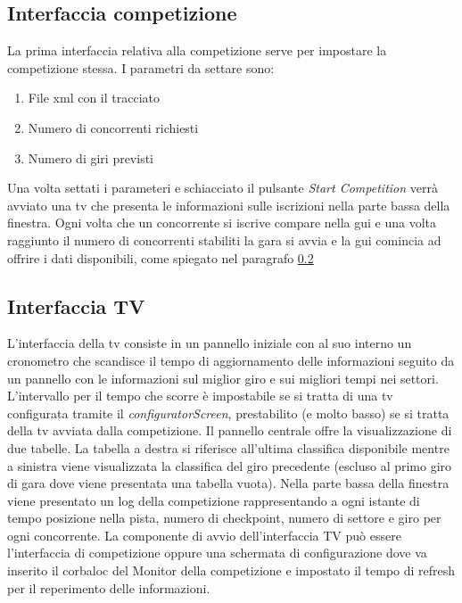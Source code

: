 \subsection{Interfaccia competizione}
La prima interfaccia relativa alla competizione serve per impostare la competizione stessa. I parametri da settare sono:
\begin{enumerate}
\item File xml con il tracciato
\item Numero di concorrenti richiesti
\item Numero di giri previsti
\end{enumerate}
Una volta settati i parameteri e schiacciato il pulsante \emph{Start Competition} verr\`{a} avviato una tv che presenta le informazioni sulle iscrizioni nella parte bassa della finestra. Ogni volta che un concorrente si iscrive compare nella gui e una volta raggiunto il numero di concorrenti stabiliti la gara si avvia e la gui comincia ad offrire i dati disponibili, come spiegato nel paragrafo \ref{interfacciaTv}
\subsection{Interfaccia TV}
\label{interfacciaTv}
L'interfaccia della tv consiste in un pannello iniziale con al suo interno un cronometro che scandisce il tempo di aggiornamento delle informazioni seguito da un pannello con le informazioni sul miglior giro e sui migliori tempi nei settori.
L'intervallo per il tempo che scorre \`{e} impostabile se si tratta di una tv configurata tramite il \emph{configuratorScreen}, prestabilito (e molto basso) se si tratta della tv avviata dalla competizione.
Il pannello centrale offre la visualizzazione di due tabelle. La tabella a destra si riferisce all'ultima classifica disponibile mentre a sinistra viene visualizzata la classifica del giro precedente (escluso al primo giro di gara dove viene presentata una tabella vuota).
Nella parte bassa della finestra viene presentato un log della competizione rappresentando a ogni istante di tempo posizione nella pista, numero di checkpoint, numero di settore e giro per ogni concorrente.
La componente di avvio dell'interfaccia TV pu\`{o} essere l'interfaccia di competizione oppure una schermata di configurazione dove va inserito il corbaloc del Monitor della competizione e impostato il tempo di refresh per il reperimento delle informazioni.